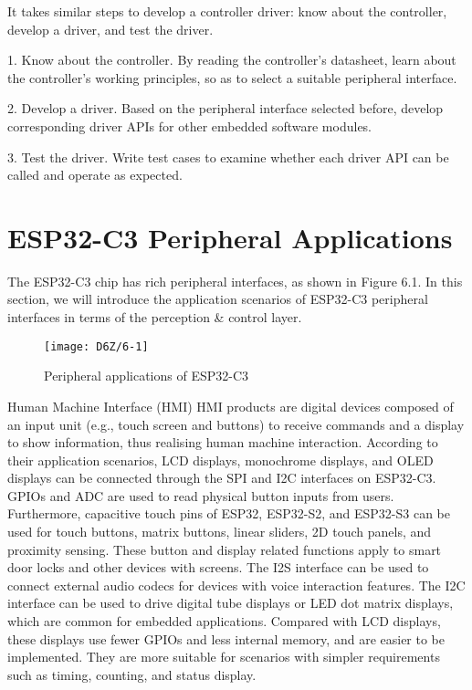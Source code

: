 \documentclass[a4paper,12pt]{book}
\begin{document}
It takes similar steps to develop a controller driver: know about the controller, develop a driver, and test the driver.

\begin{term}{1. Know about the controller.}
    By reading the controller’s datasheet, learn about the controller’s working principles, so as to select a suitable peripheral interface.
\end{term}

\begin{term}{2. Develop a driver.}
    Based on the peripheral interface selected before, develop corresponding driver APIs for other embedded software modules.
\end{term}

\begin{term}{3.	Test the driver.}
    Write test cases to examine whether each driver API can be called and operate as expected.
\end{term}

\section{ESP32-C3 Peripheral Applications}
The ESP32-C3 chip has rich peripheral interfaces, as shown in Figure 6.1. In this section, we will introduce the application scenarios of ESP32-C3 peripheral interfaces in terms of the perception \& control layer.

\begin{figure}[h!]
    \centering
    \texttt{[image: D6Z/6-1]}
    \caption{Peripheral applications of ESP32-C3}
\end{figure}

\begin{term}{Human Machine Interface (HMI)}
HMI products are digital devices composed of an input unit (e.g., touch screen and buttons) to receive commands and a display to show information, thus realising human machine interaction. According to their application scenarios, LCD displays, monochrome displays, and OLED displays can be connected through the SPI and I2C interfaces on ESP32-C3. GPIOs and ADC are used to read physical button inputs from users. Furthermore, capacitive touch pins of ESP32, ESP32-S2, and ESP32-S3 can be used for touch buttons, matrix buttons, linear sliders, 2D touch panels, and proximity sensing. These button and display related functions apply to smart door locks and other devices with screens. The I2S interface can be used to connect external audio codecs for devices with voice interaction features. The I2C interface can be used to drive digital tube displays or LED dot matrix displays, which are common for embedded applications. Compared with LCD displays, these displays use fewer GPIOs and less internal memory, and are easier to be implemented. They are more suitable for scenarios with simpler requirements such as timing, counting, and status display. 
\end{term}
\end{document}
